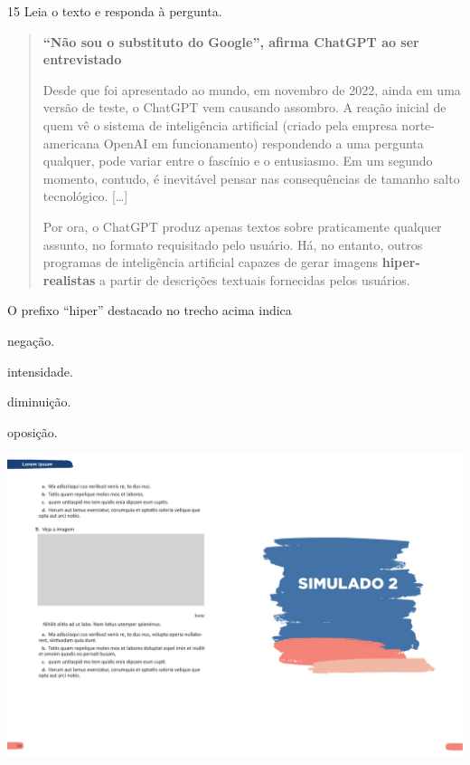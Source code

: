 \num{15} Leia o texto e responda à pergunta.

\begin{quote}
\textbf{``Não sou o substituto do Google'', afirma ChatGPT ao ser entrevistado}

Desde que foi apresentado ao mundo, em novembro de 2022, ainda em uma
versão de teste, o ChatGPT vem causando assombro. A reação inicial de
quem vê o sistema de inteligência artificial (criado pela empresa
norte-americana OpenAI em funcionamento) respondendo a uma pergunta
qualquer, pode variar entre o fascínio e o entusiasmo. Em um segundo
momento, contudo, é inevitável pensar nas consequências de tamanho salto
tecnológico. {[}\ldots{}{]}

Por ora, o ChatGPT produz apenas textos sobre praticamente qualquer
assunto, no formato requisitado pelo usuário. Há, no entanto, outros
programas de inteligência artificial capazes de gerar imagens
\textbf{hiper-realistas} a partir de descrições textuais fornecidas pelos
usuários.

\end{quote}

O prefixo ``hiper'' destacado no trecho acima indica

\begin{escolha}
  \item negação.

  \item intensidade.

  \item diminuição.

  \item oposição.
\end{escolha}


\vspace*{-3.4cm}
\hspace*{-3.7cm}\includegraphics[scale=1]{../watermarks/2simulado5ano.pdf}

